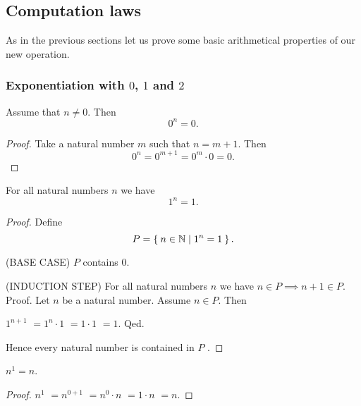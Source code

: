 \documentclass[../../arithmetic.ftl.tex]{subfiles}
\begin{document}
  \subsection{Computation laws}

  As in the previous sections let us prove some basic arithmetical properties of
  our new operation.


  \subsubsection*{Exponentiation with $0$, $1$ and $2$}

  \begin{forthel}
    \begin{proposition}\label{Arithmetic_01_04_876526}
      Assume that $n \neq 0$.
      Then \[ 0^{n} = 0. \]
    \end{proposition}
    \begin{proof}
      Take a natural number $m$ such that $n = m + 1$.
      Then
      \[
          0^{n}
        = 0^{m + 1}       %
        = 0^{m} \cdot 0   %
        = 0.              %
      \]
    \end{proof}


    \begin{proposition}\label{Arithmetic_01_04_577060}
      For all natural numbers $n$ we have \[ 1^{n} = 1. \]
    \end{proposition}
    \begin{proof}
      Define \[ P = \Set{n \in \mathbb{N} | 1^{n} = 1}. \]

      (BASE CASE) $P$ contains $0$.

      (INDUCTION STEP) For all natural numbers $n$ we have $n \in P \implies n + 1 \in P$. \\
      Proof.
        Let $n$ be a natural number.
        Assume $n \in P$.
        Then

        $  1^{n + 1}$
        $= 1^{n} \cdot 1$   %
        $= 1 \cdot 1$       %
        $= 1$.              %
      Qed.

      Hence every natural number is contained in $P$ .
    \end{proof}


    \begin{proposition}\label{Arithmetic_01_04_848167}
      $n^{1} = n$.
    \end{proposition}
    \begin{proof}
      $  n^{1}$
      $= n^{0 + 1}$       %
      $= n^{0} \cdot n$   %
      $= 1 \cdot n$       %
      $= n$.              %
    \end{proof}



\end{forthel}
\end{document}
